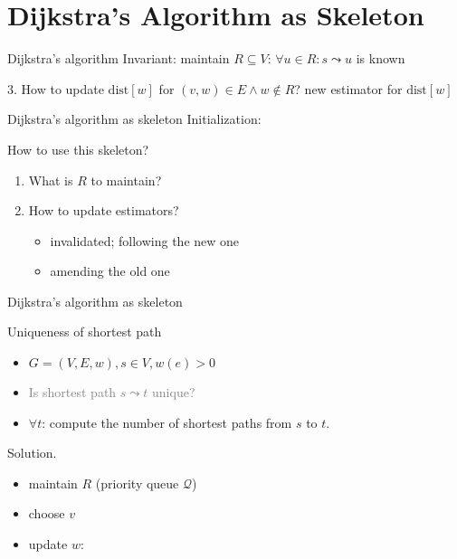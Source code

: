 \section{Dijkstra's Algorithm as Skeleton}

\begin{frame}{Dijkstra's algorithm}
  Invariant: maintain $R \subseteq V$: $\forall u \in R: s \leadsto u$ is known
  \begin{exampleblock}{3. How to update $\text{dist}[w]$ for $(v,w) \in E \land w \notin R$?}
    new estimator for $\text{dist}[w]$
  \end{exampleblock}
\end{frame}
\begin{frame}{Dijkstra's algorithm as skeleton}
  Initialization:

  \begin{alertblock}{How to use this skeleton?}
    \begin{enumerate}
      \item What is $R$ to maintain?
      \item How to update estimators?
	\begin{itemize}
	  \item invalidated; following the new one
	  \item amending the old one
	\end{itemize}
    \end{enumerate}
  \end{alertblock}
\end{frame}
\begin{frame}{Dijkstra's algorithm as skeleton}
  \begin{exampleblock}{Uniqueness of shortest path }
    \begin{itemize}
      \item $G = (V, E, w), s \in V, w(e) > 0$
      \item \textcolor{gray}{Is shortest path $s \leadsto t$ unique?}
      \item $\forall t$: compute the number of shortest paths from $s$ to $t$.
    \end{itemize}
  \end{exampleblock}

  \begin{block}{Solution.}
    \begin{itemize}
      \item maintain $R$ (priority queue $\mathcal{Q}$)
      \item choose $v$
      \item update $w$:
    \end{itemize}
  \end{block}
\end{frame}
